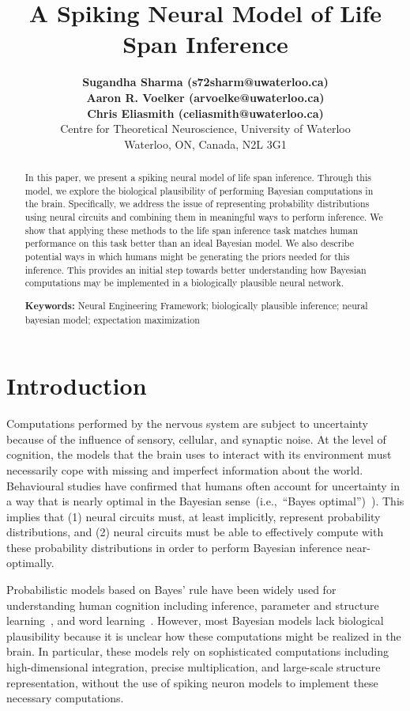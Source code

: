 \documentclass[10pt,letterpaper]{article}
\title{A Spiking Neural Model of Life Span Inference}
\author{{\large \bf Sugandha Sharma (s72sharm@uwaterloo.ca)} \\
  {\large \bf Aaron R. Voelker (arvoelke@uwaterloo.ca)} \\
  {\large \bf Chris Eliasmith (celiasmith@uwaterloo.ca)} \\
  Centre for Theoretical Neuroscience, University of Waterloo \\
  Waterloo, ON, Canada, N2L 3G1}
\begin{document}
\maketitle


\begin{abstract}
In this paper, we present a spiking neural model of life span inference. Through this model, we explore the biological plausibility of performing Bayesian computations in the brain. Specifically, we address the issue of representing probability distributions using neural circuits and combining them in meaningful ways to perform inference.  We show that applying these methods to the life span inference task matches human performance on this task better than an ideal Bayesian model.  We also describe potential ways in which humans might be generating the priors needed for this inference. This provides an initial step towards better understanding how Bayesian computations may be implemented in a biologically plausible neural network. 

\textbf{Keywords:} 
Neural Engineering Framework; biologically plausible inference; neural bayesian model; expectation maximization 
\end{abstract}


\section{Introduction}

Computations performed by the nervous system are subject to uncertainty because of the influence of sensory, cellular, and synaptic noise. At the level of cognition, the models that the brain uses to interact with its environment must necessarily cope with missing and imperfect information about the world. Behavioural studies have confirmed that humans often account for uncertainty in a way that is nearly optimal in the Bayesian sense~(i.e.,~``Bayes optimal'')~\cite{ma2006bayesian}). This implies that (1) neural circuits must, at least implicitly, represent probability distributions, and (2) neural circuits must be able to effectively compute with these probability distributions in order to perform Bayesian inference near-optimally. 

Probabilistic models based on Bayes' rule have been widely used for understanding human cognition including inference, parameter and structure learning~\cite{jacobs2011bayesian}, and word learning~\cite{xu2007word}. However, most Bayesian models lack biological plausibility because it is unclear how these computations might be realized in the brain. In particular, these models rely on sophisticated computations including high-dimensional integration, precise multiplication, and large-scale structure representation, without the use of spiking neuron models to implement these necessary computations.
\end{document}
